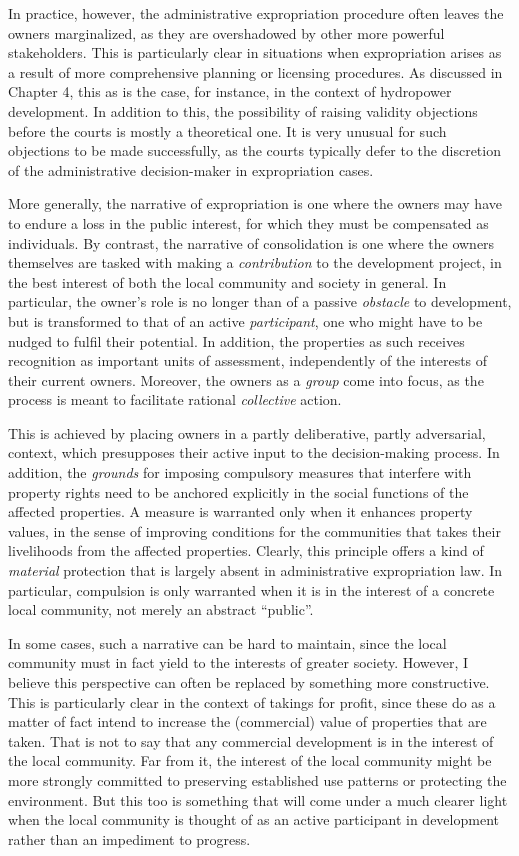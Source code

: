 In practice, however, the administrative expropriation procedure often leaves the owners marginalized, as they are overshadowed by other more powerful stakeholders. This is particularly clear in situations when expropriation arises as a result of more comprehensive planning or licensing procedures. As discussed in Chapter 4, this as is the case, for instance, in the context of hydropower development. In addition to this, the possibility of raising validity objections before the courts is mostly a theoretical one. It is very unusual for such objections to be made successfully, as the courts typically defer to the discretion of the administrative decision-maker in expropriation cases.

More generally, the narrative of expropriation is one where the owners may have to endure a loss in the public interest, for which they must be compensated as individuals. By contrast, the narrative of consolidation is one where the owners themselves are tasked with making a {\it contribution} to the development project, in the best interest of both the local community and society in general. In particular, the owner's role is no longer than of a passive {\it obstacle} to development, but is transformed to that of an active {\it participant}, one who might have to be nudged to fulfil their potential. In addition, the properties as such receives recognition as important units of assessment, independently of the interests of their current owners. Moreover, the owners as a {\it group} come into focus, as the process is meant to facilitate rational {\it collective} action.

This is achieved by placing owners in a partly deliberative, partly adversarial, context, which presupposes their active input to the decision-making process. In addition, the {\it grounds} for imposing compulsory measures that interfere with property rights need to be anchored explicitly in the social functions of the affected properties. A measure is warranted only when it enhances property values, in the sense of improving conditions for the communities that takes their livelihoods from the affected properties. Clearly, this principle offers a kind of {\it material} protection that is largely absent in administrative expropriation law. In particular, compulsion is only warranted when it is in the interest of a concrete local community, not merely an abstract ``public''.

In some cases, such a narrative can be hard to maintain, since the local community must in fact yield to the interests of greater society. However, I believe this perspective can often be replaced by something more constructive. This is particularly clear in the context of takings for profit, since these do as a matter of fact intend to increase the (commercial) value of properties that are taken. That is not to say that any commercial development is in the interest of the local community. Far from it, the interest of the local community might be more strongly committed to preserving established use patterns or protecting the environment. But this too is something that will come under a much clearer light when the local community is thought of as an active participant in development rather than an impediment to progress.

